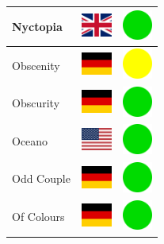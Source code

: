 \documentclass[12pt, a4paper, twoside]{report}
\begin{document}
\begin{center}
\begin{longtable}{|p{5cm}|p{2cm}|p{2cm}|}
 Nyctopia                                                   & \includegraphics[width=1cm]{../4x3/gb} &   \includegraphics[width=1cm]{../likes/y} \\ \hline
 Obscenity                                                  & \includegraphics[width=1cm]{../4x3/de} &   \includegraphics[width=1cm]{../likes/m} \\ \hline
 Obscurity                                                  & \includegraphics[width=1cm]{../4x3/de} &   \includegraphics[width=1cm]{../likes/y} \\ \hline
 Oceano                                                     & \includegraphics[width=1cm]{../4x3/us} &   \includegraphics[width=1cm]{../likes/y} \\ \hline
 Odd Couple                                                 & \includegraphics[width=1cm]{../4x3/de} &   \includegraphics[width=1cm]{../likes/y} \\ \hline
 Of Colours                                                 & \includegraphics[width=1cm]{../4x3/de} &   \includegraphics[width=1cm]{../likes/y} \\ \hline

\end{longtable}
\end{center}
\end{document}
